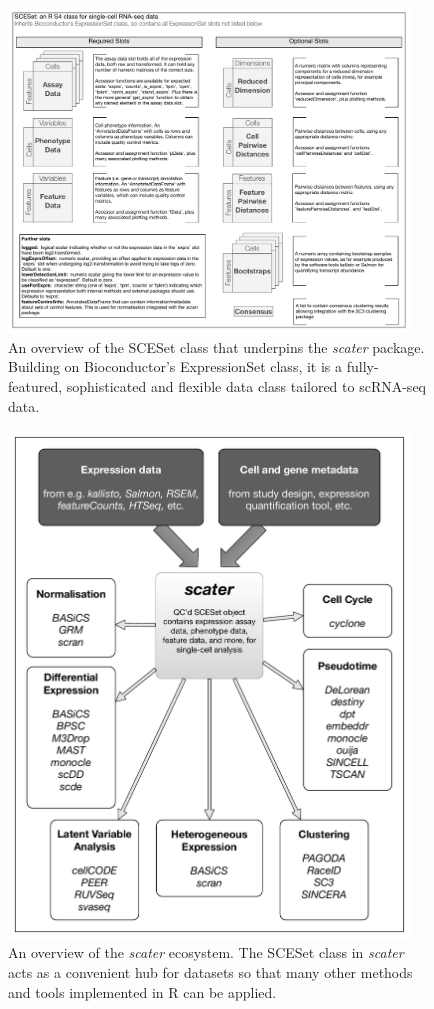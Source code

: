 \documentclass{revtex4}
\begin{document}
\begin{figure}[!tpb]%
\centerline{\includegraphics[width=0.95\textwidth]{figures/sceset_outline.pdf}}
\caption{An overview of the SCESet class that underpins the \emph{scater} package. Building on Bioconductor's ExpressionSet class, it is a fully-featured, sophisticated and flexible data class tailored to scRNA-seq data.}\label{fig:02}
\end{figure}


\begin{figure}[!tpb]
\centerline{\includegraphics[width=0.95\textwidth]{figures/scater_ecosystem.pdf}}
\caption{An overview of the \emph{scater} ecosystem. The SCESet class in \emph{scater} acts as a convenient hub for datasets so that many other methods and tools implemented in R can be applied.}\label{fig:scater-eco}
\end{figure}
\end{document}
